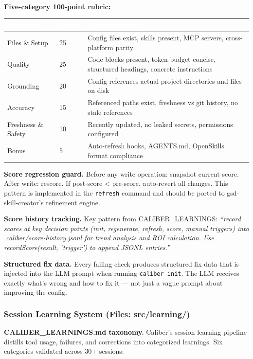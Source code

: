 \documentclass[11pt,letterpaper]{article}
\newcommand{\tableheader}[1]{\textbf{\sffamily\textcolor{white}{#1}}}
\begin{document}
\textbf{Five-category 100-point rubric:}
\begin{center}
\begin{tabularx}{\textwidth}{L{3cm}C{1.8cm}X}
\toprule
{}
\tableheader{Category} & \tableheader{Points} & \tableheader{What it checks} \\
\midrule
Files \& Setup & 25 & Config files exist, skills present, MCP servers, cross-platform parity \\
Quality & 25 & Code blocks present, token budget concise, structured headings, concrete instructions \\
Grounding & 20 & Config references actual project directories and files on disk \\
Accuracy & 15 & Referenced paths exist, freshness vs git history, no stale references \\
Freshness \& Safety & 10 & Recently updated, no leaked secrets, permissions configured \\
Bonus & 5 & Auto-refresh hooks, AGENTS.md, OpenSkills format compliance \\
\bottomrule
\end{tabularx}
\end{center}

\textbf{Score regression guard.} Before any write operation: snapshot current score. After write: rescore. If post-score < pre-score, auto-revert all changes. This pattern is implemented in the \texttt{refresh} command and should be ported to gsd-skill-creator's refinement engine.

\textbf{Score history tracking.} Key pattern from CALIBER\_LEARNINGS: \textit{``record scores at key decision points (init, regenerate, refresh, score, manual triggers) into .caliber/score-history.jsonl for trend analysis and ROI calculation. Use recordScore(result, 'trigger') to append JSONL entries.''}

\textbf{Structured fix data.} Every failing check produces structured fix data that is injected into the LLM prompt when running \texttt{caliber init}. The LLM receives exactly what's wrong and how to fix it — not just a vague prompt about improving the config.

\subsubsection{Session Learning System (Files: src/learning/)}

\textbf{CALIBER\_LEARNINGS.md taxonomy.} Caliber's session learning pipeline distills tool usage, failures, and corrections into categorized learnings. Six categories validated across 30+ sessions:
\end{document}
